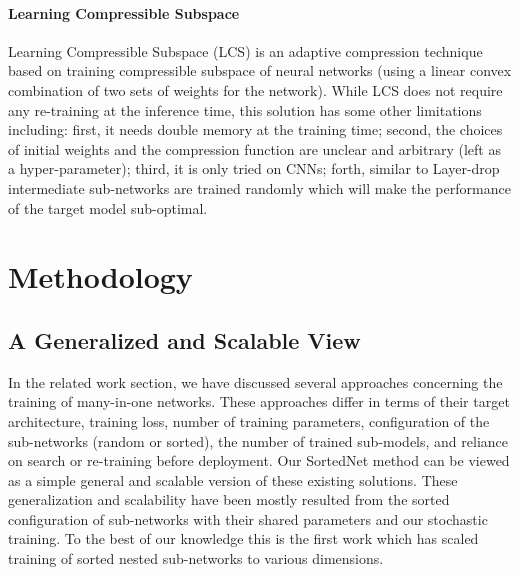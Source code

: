 \documentclass[letterpaper]{article} %
\begin{document}
\paragraph{Learning Compressible Subspace~\cite{Nunez_2023_WACV}}
Learning Compressible Subspace (LCS) is an adaptive compression technique based on training compressible subspace of neural networks (using a linear convex combination of two sets of weights for the network). While LCS does not require any re-training at the inference time,  this solution has some other limitations including: first, it needs double memory at the training time; second, the choices of initial weights and the compression function are unclear and arbitrary (left as a hyper-parameter); third, it is only tried on CNNs; forth, similar to Layer-drop intermediate sub-networks are trained randomly which will make the performance of the target model sub-optimal.




\section{Methodology}
\label{sec:method}
\subsection{A Generalized and Scalable View }
In the related work section, we have discussed several approaches concerning the training of many-in-one networks. These approaches differ in terms of their target architecture, training loss, number of training parameters, configuration of the sub-networks (random or sorted), the number of trained sub-models, and reliance on search or re-training before deployment. 
Our SortedNet method can be viewed as a simple general and scalable version of these existing solutions. These generalization and scalability have been mostly resulted from the sorted configuration of sub-networks with their shared parameters and our stochastic training. To the best of our knowledge this is the first work which has scaled training of sorted nested sub-networks to various dimensions.
\end{document}
